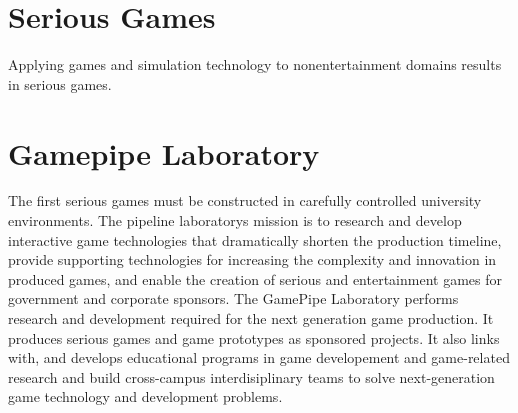     \section*{Serious Games}
    Applying games and simulation technology to nonentertainment domains results in serious games. 

    \section*{Gamepipe Laboratory}
    The first serious games must be constructed in carefully controlled university environments. The pipeline laboratorys mission is to research and develop interactive game technologies that dramatically shorten the production timeline, provide supporting technologies for increasing the complexity and innovation in produced games, and enable the creation of serious and entertainment games for government and corporate sponsors. The GamePipe Laboratory performs research and development required for the next generation game production. It produces serious games and game prototypes as sponsored projects. It also links with, and develops educational programs in game developement and game-related research and build cross-campus interdisiplinary teams to solve next-generation game technology and development problems. 
